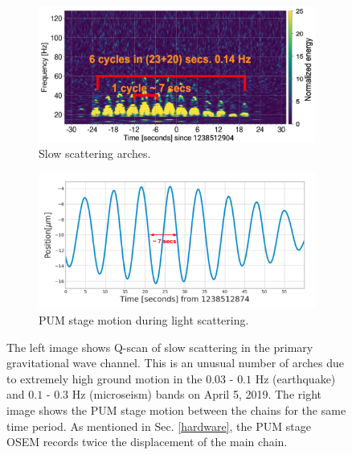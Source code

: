 \documentclass[12pt]{iopart}
\begin{document}
\begin{figure}[h]
\captionsetup[subfigure]{font=scriptsize,labelfont=scriptsize}
   \centering
    \begin{subfigure}[b]{0.45\textwidth}
        \centering
         \includegraphics[width= \textwidth]{slow_arch3.png}
         \caption{Slow scattering arches.}
         \label{fig:slowscat}
    \end{subfigure}
    \hfill
    \begin{subfigure}[b]{0.47\textwidth}
        \centering
         \includegraphics[width =\textwidth]{ts_sus3.png}
         \caption{PUM stage motion during light scattering.}
         \label{fig:timeseriessus}
         
    
    \end{subfigure}
    \caption{The left image shows Q-scan of  slow scattering in the primary gravitational wave channel. This is an unusual number of arches due to extremely high ground motion in the $0.03$ - $0.1$ Hz (earthquake) and $0.1$ - $0.3$  Hz (microseism) bands on April 5, 2019. The right image shows the PUM stage motion between the chains for the same time period. As mentioned in Sec. \ref{hardware}, the PUM stage OSEM records twice the displacement of the main chain.}
    \label{fig:slowscat_sus}
    
\end{figure}
\end{document}
